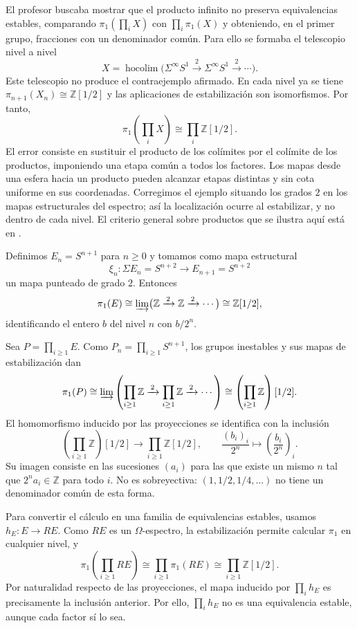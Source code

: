 \begin{ejem}\label{ejem:c14-producto-denominadores}
\begin{nota}
El profesor buscaba mostrar que el producto infinito no preserva equivalencias estables, comparando $\pi_1(\prod_iX)$ con $\prod_i\pi_1(X)$ y obteniendo, en el primer grupo, fracciones con un denominador común. Para ello se formaba el telescopio nivel a nivel
\[
X=\operatorname{hocolim}\bigl(\Sigma^\infty S^1
\xrightarrow{\,2\,}\Sigma^\infty S^1
\xrightarrow{\,2\,}\cdots\bigr).
\]
Este telescopio no produce el contraejemplo afirmado. En cada nivel ya se tiene $\pi_{n+1}(X_n)\cong\mathbb Z[1/2]$ y las aplicaciones de estabilización son isomorfismos. Por tanto,
\[
\pi_1\left(\prod_iX\right)\cong\prod_i\mathbb Z[1/2].
\]
El error consiste en sustituir el producto de los colímites por el colímite de los productos, imponiendo una etapa común a todos los factores. Los mapas desde una esfera hacia un producto pueden alcanzar etapas distintas y sin cota uniforme en sus coordenadas. Corregimos el ejemplo situando los grados $2$ en los mapas estructurales del espectro; así la localización ocurre al estabilizar, y no dentro de cada nivel. El criterio general sobre productos que se ilustra aquí está en \cite[Ejercicio~2.7.26]{malkiewich}.
\end{nota}

Definimos $E_n=S^{n+1}$ para $n\ge0$ y tomamos como mapa estructural
\[
\xi_n\colon\Sigma E_n=S^{n+2}\to E_{n+1}=S^{n+2}
\]
 un mapa punteado de grado $2$. Entonces
\[
\pi_1(E)\cong\varinjlim\bigl(\mathbb Z\xrightarrow{\,2\,}\mathbb Z
\xrightarrow{\,2\,}\cdots\bigr)\cong\mathbb Z[1/2],
\]
identificando el entero $b$ del nivel $n$ con $b/2^n$.

Sea $P=\prod_{i\ge1}E$. Como $P_n=\prod_{i\ge1}S^{n+1}$, los grupos inestables y sus mapas de estabilización dan
\[
\pi_1(P)\cong\varinjlim\left(
\prod_{i\ge1}\mathbb Z\xrightarrow{\,2\,}
\prod_{i\ge1}\mathbb Z\xrightarrow{\,2\,}\cdots\right)
\cong\left(\prod_{i\ge1}\mathbb Z\right)[1/2].
\]
El homomorfismo inducido por las proyecciones se identifica con la inclusión
\[
\left(\prod_{i\ge1}\mathbb Z\right)[1/2]
\longrightarrow\prod_{i\ge1}\mathbb Z[1/2],\qquad
\frac{(b_i)_i}{2^n}\longmapsto\left(\frac{b_i}{2^n}\right)_i.
\]
Su imagen consiste en las sucesiones $(a_i)$ para las que existe un mismo $n$ tal que $2^na_i\in\mathbb Z$ para todo $i$. No es sobreyectiva: $(1,1/2,1/4,\ldots)$ no tiene un denominador común de esta forma.

Para convertir el cálculo en una familia de equivalencias estables, usamos $h_E\colon E\to RE$. Como $RE$ es un $\Omega$-espectro, la estabilización permite calcular $\pi_1$ en cualquier nivel, y
\[
\pi_1\left(\prod_{i\ge1}RE\right)
\cong\prod_{i\ge1}\pi_1(RE)
\cong\prod_{i\ge1}\mathbb Z[1/2].
\]
Por naturalidad respecto de las proyecciones, el mapa inducido por $\prod_ih_E$ es precisamente la inclusión anterior. Por ello, $\prod_ih_E$ no es una equivalencia estable, aunque cada factor sí lo sea.
\end{ejem}

